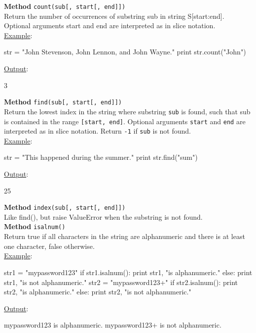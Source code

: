 \noindent
{\bf Method} {\tt count(sub[, start[, end]])}\\

\noindent
Return the number of occurrences of substring sub in string S[start:end]. 
Optional arguments start and end are interpreted as in slice notation.\\

\noindent
\underline{Example}:
\begin{bluecode}
str = "John Stevenson, John Lennon, and John Wayne."
print str.count("John")
\end{bluecode}
\underline{Output}:
\begin{bluecode}
3
\end{bluecode}
\vspace{4mm}

\noindent
{\bf Method} {\tt find(sub[, start[, end]])}\\

\noindent
Return the lowest index in the string where substring {\tt sub} is found, such that 
sub is contained in the range {\tt [start, end]}. Optional arguments {\tt start} and {\tt end} 
are interpreted as in slice notation. Return {\tt -1} if {\tt sub} is not found.\\

\noindent
\underline{Example}:
\begin{bluecode}
str = "This happened during the summer."
print str.find("sum")
\end{bluecode}
\underline{Output}:
\begin{bluecode}
25
\end{bluecode}
\vspace{4mm}

\noindent
{\bf Method} {\tt index(sub[, start[, end]])}\\

\noindent
Like find(), but raise ValueError when the substring is not found.\\

\noindent
{\bf Method} {\tt isalnum()}\\

\noindent
Return true if all characters in the string are alphanumeric and 
there is at least one character, false otherwise.\\

\noindent
\underline{Example}:
\begin{bluecode}
str1 = "mypassword123"
if str1.isalnum():
    print str1, "is alphanumeric."
else: 
    print str1, "is not alphanumeric."
str2 = "mypassword123+"
if str2.isalnum():
    print str2, "is alphanumeric."
else: 
    print str2, "is not alphanumeric."
\end{bluecode}
\underline{Output}:
\begin{bluecode}
mypassword123 is alphanumeric.
mypassword123+ is not alphanumeric.
\end{bluecode}
\vspace{4mm}

